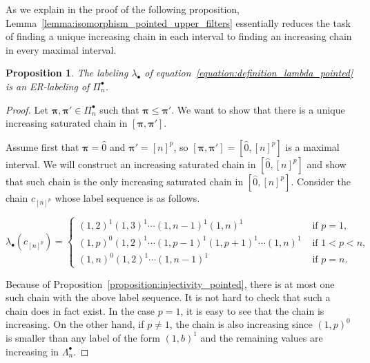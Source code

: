 \documentclass[11pt]{article}
\newtheorem{prop}[theo]{Proposition}
\theoremstyle{definition}
\numberwithin{equation}{section}
\newcommand{\bpi}{\pmb{\pi}}
\begin{document}
As we explain in the proof of the following proposition, Lemma~\ref{lemma:isomorphism_pointed_upper_filters} essentially reduces the task of finding a unique increasing chain in each interval to finding an increasing chain in every maximal interval.






\begin{prop}\label{proposition:ER_pointed}
 The labeling $\lambda_{\bullet}$ of equation~\eqref{equation:definition_lambda_pointed} is an ER-labeling of $\Pi_{n}^{\bullet}$.
\end{prop}

\begin{proof}
Let $\bpi,\bpi' \in \Pi_n^{\bullet}$ such that $\bpi \leq \bpi'$. We want to show that there is a unique increasing saturated chain in $[\bpi,\bpi']$. 

Assume first that $\bpi=\hat{0}$ and $\bpi'=[n]^p$, so $[\bpi,\bpi']=[\hat{0},[n]^p]$ is a maximal interval. We will construct an increasing saturated chain in $[\hat{0},[n]^p]$ and show that such chain is the only increasing saturated chain in  $[\hat{0},[n]^p]$.  Consider the chain $c_{[n]^p}$ whose label sequence is as follows.

 
\begin{equation}\label{equation:increasing_chain_pointed}
    \lambda_{\bullet}(c_{[n]^p})=
    \begin{cases}
     (1,2)^1 (1,3)^1\cdots (1,n-1)^1 (1,n)^1 & \text{ if } p =1,\\ 
     (1,p)^0(1,2)^1\cdots (1,p-1)^1(1,p+1)^1 \cdots (1,n)^1  & \text{ if } 1<p<n,\\
     (1,n)^0(1,2)^1\cdots (1,n-1)^1& \text{ if } p=n.
    \end{cases}
 \end{equation}   

 
Because of Proposition~\ref{proposition:injectivity_pointed}, there is at most one such chain with the above label sequence.  It is not hard to check that such a chain does in fact exist. In the case $p=1$, it is easy to see that the chain is increasing.  On the other hand, if $p\neq 1$, the chain is also increasing since $(1,p)^0$ is smaller than any  label of the form $(1,b)^1$ and the remaining values are increasing in $\Lambda_n^\bullet$. 


\end{proof}
\end{document}
